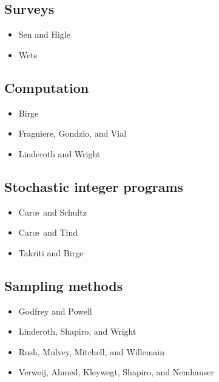 \documentclass[12pt]{article}
\begin{document}
\subsection{Surveys}

\begin{itemize}
\item
Sen and Higle~\cite{sen1}
\item
Wets~\cite{wets1}
\end{itemize}

 \subsection{Computation}

\begin{itemize}
\item
Birge~\cite{birge4}
\item
Fragniere, Gondzio, and Vial~\cite{fragniere2}
\item
Linderoth and Wright~\cite{linderoth3}
\end{itemize}

\subsection{Stochastic integer programs}

\begin{itemize}
\item
Car\oe  \ and Schultz~\cite{caroe2}
\item
Car\oe  \ and Tind~\cite{caroe1}
\item
Takriti and Birge~\cite{takriti1}
\end{itemize}

\subsection{Sampling methods}

\begin{itemize}
\item
Godfrey and Powell~\cite{godfrey1}
\item
Linderoth, Shapiro, and Wright~\cite{linderoth4}
\item
Rush, Mulvey, Mitchell, and Willemain~\cite{mulvey3}
\item
Verweij, Ahmed, Kleywegt, Shapiro, and Nemhauser~\cite{verweij1}
\end{itemize}
\end{document}
